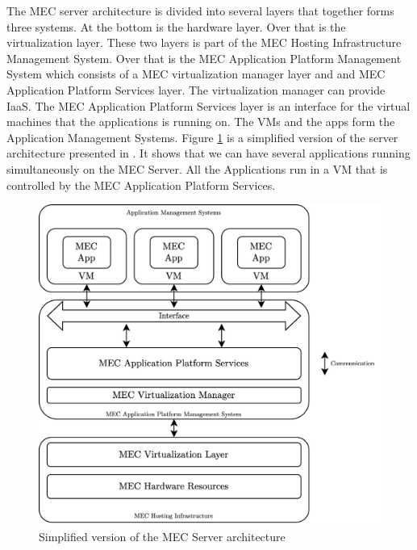 The MEC server architecture is divided into several layers that together forms three systems\cite{patel_mec_nodate}. At the bottom is the hardware layer. Over that is the virtualization layer. These two layers is part of the MEC Hosting Infrastructure Management System. Over that is the MEC Application Platform Management System which consists of a MEC virtualization manager layer and and MEC Application Platform Services layer. The virtualization manager can provide IaaS. The MEC Application Platform Services layer is an interface for the virtual machines that the applications is running on. The VMs and the apps form the Application Management Systems. Figure \ref{fig:MEC_Server} is a simplified version of the server architecture presented in \cite{patel_mec_nodate}. It shows that we can have several applications running simultaneously on the MEC Server. All the Applications run in a VM that is controlled by the MEC Application Platform Services.
\begin{figure}[t]
    \centering
    \includegraphics[scale=0.8]{chapters/architectures/figures/MEC_Server.png}
    \caption{Simplified version of the MEC Server architecture}
    \label{fig:MEC_Server}
\end{figure}

